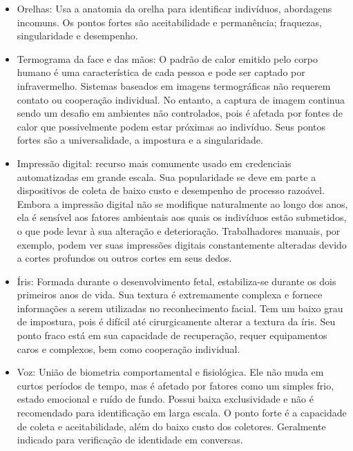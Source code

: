 \begin{itemize}
    \item Orelhas: Usa a anatomia da orelha para identificar indivíduos, abordagens 
    incomuns. Os pontos fortes são aceitabilidade e permanência; fraquezas, 
    singularidade e desempenho.

    \item Termograma da face e das mãos: O padrão de calor emitido pelo corpo 
    humano é uma característica de cada pessoa e pode ser captado por 
    infravermelho. Sistemas baseados em imagens termográficas não requerem 
    contato ou cooperação individual. No entanto, a captura de imagem continua 
    sendo um desafio em ambientes não controlados, pois é afetada por fontes de 
    calor que possivelmente podem estar próximas ao indivíduo. Seus pontos fortes 
    são a universalidade, a impostura e a singularidade.

    \item Impressão digital: recurso mais comumente usado em credenciais 
     automatizadas em grande escala.  Sua popularidade se deve em parte a 
     dispositivos de coleta de baixo custo e desempenho de processo razoável. 
     Embora a impressão digital não se modifique naturalmente ao longo dos anos, 
     ela é sensível aos fatores ambientais aos quais os indivíduos estão 
     submetidos, o que pode levar à sua alteração e deterioração. Trabalhadores 
     manuais, por exemplo, podem ver suas impressões digitais constantemente 
     alteradas devido a cortes profundos ou outros cortes em seus dedos.

    \item Íris: Formada durante o desenvolvimento fetal, estabiliza-se durante 
    os dois primeiros anos de vida. Sua textura é extremamente complexa e 
    fornece informações a serem utilizadas no reconhecimento facial. Tem um baixo grau 
    de impostura, pois é difícil até cirurgicamente alterar a textura da íris. 
    Seu ponto fraco está em sua capacidade de recuperação, requer equipamentos 
    caros e complexos, bem como cooperação individual.

    \item Voz: União de biometria comportamental e fisiológica. Ele não muda 
    em curtos períodos de tempo, mas é afetado por fatores como um simples frio, 
    estado emocional e ruído de fundo. Possui baixa exclusividade e não é 
    recomendado para identificação em larga escala. O ponto forte é a capacidade 
    de coleta e aceitabilidade, além do baixo custo dos coletores. Geralmente 
    indicado para verificação de identidade em conversas.
\end{itemize}

